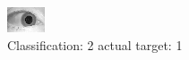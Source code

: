 \begin{figure}[h!]
\begin{center}
\includegraphics[width=0.60\columnwidth]{figures/ID1470_class_2_target_1.png}
\end{center}
\caption{ Classification: 2 actual target: 1}
\label{fig:ID1470_class_2_target_1}
\end{figure}
